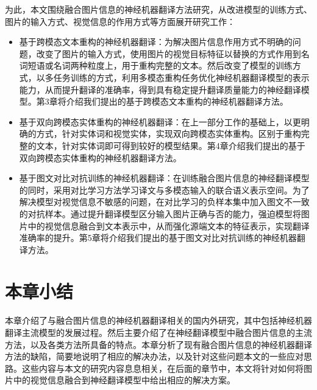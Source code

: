 为此，本文围绕融合图片信息的神经机器翻译方法研究，从改进模型的训练方式、图片的输入方式、视觉信息的作用方式等方面展开研究工作：
\begin{itemize}
    \item {\sffamily 基于跨模态文本重构的神经机器翻译：}为解决图片信息作用方式不明确的问题，改变了图片的输入方式，使用图片的视觉目标特征以替换的方式作用到名词短语或名词两种粒度上，用于重构完整的文本。然后改变了模型的训练方式，以多任务训练的方式，利用多模态重构任务优化神经机器翻译模型的表示能力，从而提升翻译的准确率，得到具有稳定提升翻译质量能力的神经翻译模型。第3章将介绍我们提出的基于跨模态文本重构的神经机器翻译方法。
    \item {\sffamily 基于双向跨模态实体重构的神经机器翻译：}在上一部分工作的基础上，以更明确的方式，针对实体词和视觉实体，实现双向跨模态实体重构。区别于重构完整的文本，针对实体词即可得到较好的模型结果。第4章介绍我们提出的基于双向跨模态实体重构的神经机器翻译方法。
    \item {\sffamily 基于图文对比对抗训练的神经机器翻译：}在训练融合图片信息的神经翻译模型的同时，采用对比学习方法学习译文与多模态输入的联合语义表示空间。为了解决模型对视觉信息不敏感的问题，在对比学习的负样本集中加入图文不一致的对抗样本。通过提升翻译模型区分输入图片正确与否的能力，强迫模型将图片中的视觉信息融合到文本表示中，从而强化源端文本的特征表示，实现翻译准确率的提升。第5章将介绍我们提出的基于图文对比对抗训练的神经机器翻译方法。
\end{itemize}

\section{本章小结}
本章介绍了与融合图片信息的神经机器翻译相关的国内外研究，其中包括神经机器翻译主流模型的发展过程。然后主要介绍了在神经翻译模型中融合图片信息的主流方法，以及各类方法所具备的特点。本章分析了现有融合图片信息的神经机器翻译方法的缺陷，简要地说明了相应的解决办法，以及针对这些问题本文的一些应对思路。这些内容与本文的研究内容息息相关，在后面的章节中，本文将针对如何将图片中的视觉信息融合到神经翻译模型中给出相应的解决方案。

